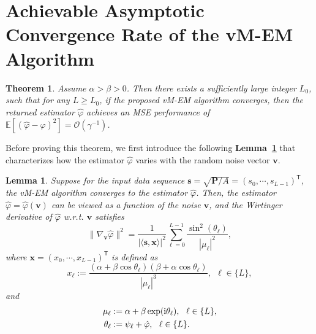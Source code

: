 \documentclass[a4paper,12pt]{article}
\newtheorem{theorem}{\bf Theorem}
\newtheorem{lemma}{\bf Lemma}
\def \T {^{\mathsf{T}}}
\def \ri {{\rm i}}
\begin{document}
\section{Achievable Asymptotic Convergence Rate of the vM-EM Algorithm}

\begin{theorem} \label{thm:asymp_perf_vM-EM}
    Assume $\alpha>\beta>0$. Then there exists a sufficiently large integer $L_0$, such that for any $L\geq L_0$, if the proposed vM-EM algorithm converges, then the returned estimator $\hat{\varphi}$ achieves an MSE performance of $\mathbb{E}[(\hat{\varphi}-\varphi)^2] = \mathcal{O}(\gamma^{-1})$.  
\end{theorem}

Before proving this theorem, we first introduce the following {\bf Lemma~\ref{lemma_Wirtinger_derivative_of_vM-EM_estimator}} that characterizes how the estimator $\hat{\varphi}$ varies with the random noise vector $\bm v$. 

\begin{lemma} \label{lemma_Wirtinger_derivative_of_vM-EM_estimator}
    Suppose for the input data sequence ${\bm s} = \sqrt{{\bm P}/A} = (s_0, \cdots, s_{L-1})\T$, the vM-EM algorithm converges to the estimator $\hat{\varphi}$. Then, the estimator $\hat{\varphi} = \hat{\varphi}({\bm v})$ can be viewed as a function of the noise $\bm v$, and the Wirtinger derivative of $\hat{\varphi}$ w.r.t. $\bm v$ satisfies 
    \begin{equation}
        \|\nabla_{\bm v}\hat{\varphi}\|^2 = \frac{1}{|\langle {\bm s}, {\bm x}\rangle|^2}\sum_{\ell=0}^{L-1}  \frac{\sin^2(\theta_\ell)}{|\mu_\ell|^2}, 
    \end{equation} 
    where ${\bm x} = (x_0, \cdots, x_{L-1})\T$ is defined as 
    \begin{equation}
        x_{\ell} := \frac{(\alpha+\beta \cos\theta_\ell)(\beta+\alpha\cos\theta_\ell)}{|\mu_\ell|^3},~~\ell\in\{L\}, 
    \end{equation}
    and 
    \begin{equation}
        \begin{aligned}
            \mu_\ell & := \alpha+\beta \exp(\ri \theta_\ell),~~\ell\in\{L\}, \\
            \theta_\ell & := \psi_\ell + \hat{\varphi}, ~~\ell\in\{L\}. 
        \end{aligned}
    \end{equation}
\end{lemma}
\end{document}
